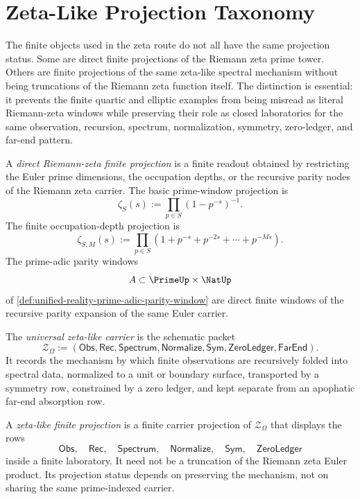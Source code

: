 \section{Zeta-Like Projection Taxonomy}
\label{sec:unified-reality-zeta-like-projection-taxonomy}

The finite objects used in the zeta route do not all have the same
projection status.  Some are direct finite projections of the Riemann
zeta prime tower.  Others are finite projections of the same
zeta-like spectral mechanism without being truncations of the Riemann
zeta function itself.  The distinction is essential: it prevents the
finite quartic and elliptic examples from being misread as literal
Riemann-zeta windows while preserving their role as closed laboratories
for the same observation, recursion, spectrum, normalization, symmetry,
zero-ledger, and far-end pattern.

\begin{definition}
\label{def:unified-reality-direct-riemann-zeta-finite-projection}
A \emph{direct Riemann-zeta finite projection} is a finite readout
obtained by restricting the Euler prime dimensions, the occupation
depths, or the recursive parity nodes of the Riemann zeta carrier.  The
basic prime-window projection is
$$
\zeta_S(s):=\prod_{p\in S}(1-p^{-s})^{-1}.
$$
The finite occupation-depth projection is
$$
\zeta_{S,M}(s)
:=
\prod_{p\in S}
\left(1+p^{-s}+p^{-2s}+\cdots+p^{-Ms}\right).
$$
The prime-adic parity windows
$$
A\subset\PrimeUp\times\NatUp
$$
of \autoref{def:unified-reality-prime-adic-parity-window} are direct
finite windows of the recursive parity expansion of the same Euler
carrier.
\end{definition}

\begin{definition}
\label{def:unified-reality-universal-zeta-like-carrier}
The \emph{universal zeta-like carrier} is the schematic packet
$$
\mathcal Z_{\Omega}
:=
(
\mathsf{Obs},
\mathsf{Rec},
\mathsf{Spectrum},
\mathsf{Normalize},
\mathsf{Sym},
\mathsf{ZeroLedger},
\mathsf{FarEnd}
).
$$
It records the mechanism by which finite observations are recursively
folded into spectral data, normalized to a unit or boundary surface,
transported by a symmetry row, constrained by a zero ledger, and kept
separate from an apophatic far-end absorption row.
\end{definition}

\begin{definition}
\label{def:unified-reality-zeta-like-finite-projection}
A \emph{zeta-like finite projection} is a finite carrier projection of
$\mathcal Z_{\Omega}$ that displays the rows
$$
\mathsf{Obs},
\quad
\mathsf{Rec},
\quad
\mathsf{Spectrum},
\quad
\mathsf{Normalize},
\quad
\mathsf{Sym},
\quad
\mathsf{ZeroLedger}
$$
inside a finite laboratory.  It need not be a truncation of the Riemann
zeta Euler product.  Its projection status depends on preserving the
mechanism, not on sharing the same prime-indexed carrier.
\end{definition}


